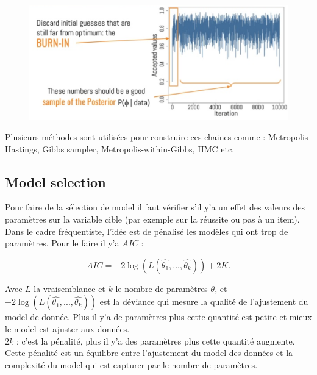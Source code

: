 \begin{figure}[H]
	\begin{center}
		\includegraphics[width=\textwidth]{images/chapitre5/mcmc_iterations.png}
	\end{center}
	\caption{}
	\label{mcmc_iterations}
\end{figure}

Plusieurs méthodes sont utilisées pour construire ces chaines comme : Metropolis-Hastings, Gibbs sampler, Metropolis-within-Gibbs, HMC etc.

\subsection{Model selection}
Pour faire de la sélection de model il faut vérifier s’il y’a un effet des valeurs des paramètres sur la variable cible (par exemple sur la réussite ou pas à un item). \\
Dans le cadre fréquentiste, l’idée est de pénalisé les modèles qui ont trop de paramètres. Pour le faire il y’a \(\displaystyle AIC \)  :

\begin{equation}
	AIC = -2 \log (L(\widehat{\theta_{1}},...,\widehat{\theta_{k}} )) + 2K.
	\label{aic_formula}
\end{equation}

Avec \(\displaystyle L \) la vraisemblance et \(\displaystyle k \) le nombre de paramètres \(\displaystyle \theta \), et \\
\(\displaystyle -2 \log (L(\widehat{\theta_{1}},...,\widehat{\theta_{k}} )) \) est la déviance qui mesure la qualité de l’ajustement du model de donnée. Plus il y’a de paramètres plus cette quantité est petite et mieux le model est ajuster aux données. \\
\(\displaystyle 2k \) : c’est la pénalité, plus il y’a des paramètres plus cette quantité augmente. Cette pénalité est un équilibre entre l’ajustement du model des données et la complexité du model qui est capturer par le nombre de paramètres. \\ \\

